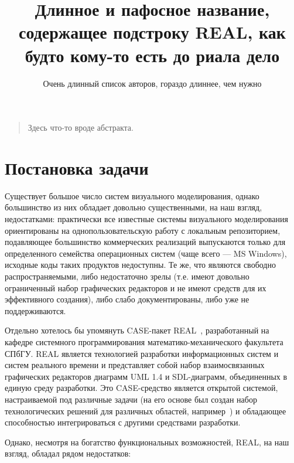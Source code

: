 \documentclass[a5paper]{article}
\title{Длинное и пафосное название, содержащее подстроку REAL, как будто кому-то есть до риала дело}
\author{Очень длинный список авторов, гораздо длиннее, чем нужно}
\date{}
\begin{document}
\maketitle
\thispagestyle{empty}

\begin{quote}
\small\noindent
Здесь что-то вроде абстракта.
\end{quote}

\section{Постановка задачи}
Существует большое число систем визуального моделирования, однако
большинство из них обладает довольно существенными, на наш взгляд,
недостатками: практически все известные системы визуального
моделирования ориентированы на однопользовательскую работу с локальным
репозиторием, подавляющее большинство коммерческих реализаций
выпускаются только для определенного семейства операционных систем
(чаще всего --- MS Windows), исходные коды таких продуктов недоступны. Те
же, что являются свободно распространяемыми, либо недостаточно зрелы
(т.е. имеют довольно ограниченный набор графических редакторов и не имеют
средств для их эффективного создания), либо слабо документированы, либо
уже не поддерживаются.

Отдельно хотелось бы упомянуть CASE-пакет REAL~\cite{real}, разработанный на
кафедре системного программирования математико-механического факультета
СПбГУ. REAL является технологией разработки информационных систем и
систем реального времени и представляет собой набор взаимосвязанных
графических редакторов диаграмм UML 1.4 и SDL-диаграмм, объединенных в
единую среду разработки. Это CASE-средство является открытой системой,
настраиваемой под различные задачи (на его основе был создан набор
технологических решений для различных областей, например~\cite{realIt}) и
обладающее способностью интегрироваться с другими средствами
разработки.

Однако, несмотря на богатство функциональных возможностей,
REAL, на наш взгляд, обладал рядом недостатков:
\end{document}
